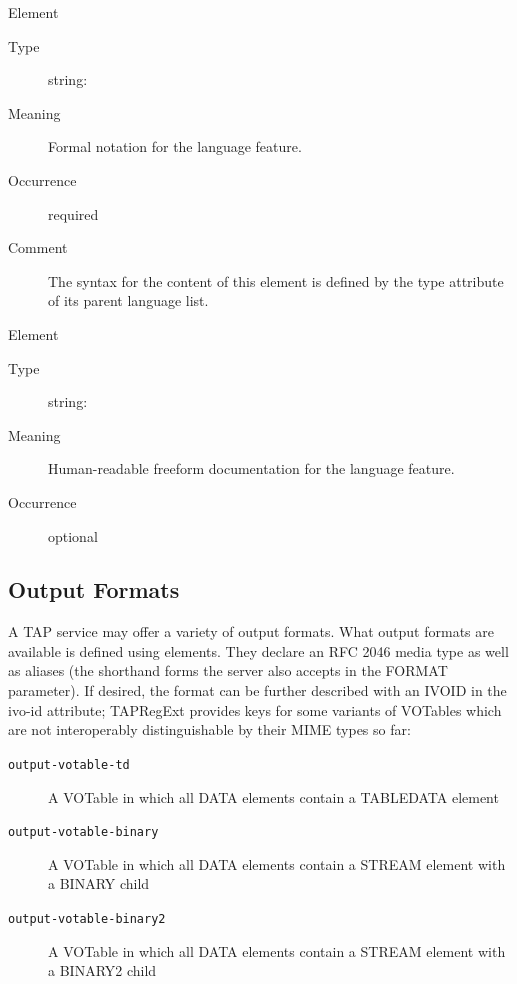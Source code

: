 \documentclass{ivoa}
\begin{document}
\begingroup\small\begin{bigdescription}\item[Element \xmlel{form}]
\begin{description}
\item[Type] string: 
\item[Meaning] 
            Formal notation for the language feature.
          
\item[Occurrence] required
\item[Comment] 
            The syntax for the content of this element is defined by the
            type attribute of its parent language list.
          

\end{description}
\item[Element \xmlel{description}]
\begin{description}
\item[Type] string: 
\item[Meaning] 
            Human-readable freeform documentation for the language feature.
          
\item[Occurrence] optional

\end{description}


\end{bigdescription}\endgroup

\endgroup

\subsection{Output Formats}

\label{outforms}

A TAP service may offer a variety of output formats.
What output formats are available is defined using
 elements.   They 
declare an RFC 2046 media type \citep{std:MIME} as well
as aliases (the shorthand forms the server also accepts in the 
FORMAT parameter).  If desired, the format can be further described with an
IVOID in the ivo-id attribute; TAPRegExt provides keys for some variants of
VOTables which are not interoperably distinguishable by their MIME types so far:


\begin{description}
\item[\normalfont\texttt{output-votable-td}]A VOTable in which all DATA elements contain a TABLEDATA element
\item[\normalfont\texttt{output-votable-binary}]A VOTable in which all DATA elements contain a STREAM element
	with a BINARY child
\item[\normalfont\texttt{output-votable-binary2}]A VOTable in which all DATA elements contain a STREAM element
	with a BINARY2 child
\end{description}
\end{document}
